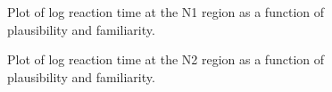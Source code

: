 \documentclass[
  12pt,
  letterpaper,
]{scrreprt}
\begin{document}
\begin{figure}[htbp]

\caption{\label{fig-N1Staub}Plot of log reaction time at the N1 region
as a function of plausibility and familiarity.}


\end{figure}%

\begin{figure}[htbp]

\caption{\label{fig-N2Staub}Plot of log reaction time at the N2 region
as a function of plausibility and familiarity.}


\end{figure}%
\end{document}
